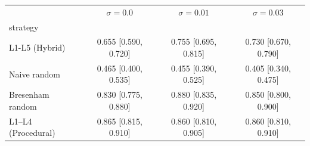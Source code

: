 \begin{tabular}{lccc}
\toprule
 & $\sigma=0.0$ & $\sigma=0.01$ & $\sigma=0.03$ \\
strategy &  &  &  \\
\midrule
L1-L5 (Hybrid) & 0.655 [0.590, 0.720] & 0.755 [0.695, 0.815] & 0.730 [0.670, 0.790] \\
Naive random & 0.465 [0.400, 0.535] & 0.455 [0.390, 0.525] & 0.405 [0.340, 0.475] \\
Bresenham random & 0.830 [0.775, 0.880] & 0.880 [0.835, 0.920] & 0.850 [0.800, 0.900] \\
L1–L4 (Procedural) & 0.865 [0.815, 0.910] & 0.860 [0.810, 0.905] & 0.860 [0.810, 0.910] \\
\bottomrule
\end{tabular}
